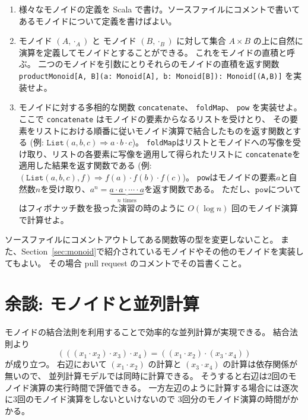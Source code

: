 \documentclass[a4paper,twoside,onecolumn,openany,article]{memoir}
\theoremstyle{remark}
\begin{document}
\begin{enumerate}
\item 様々なモノイドの定義を Scala で書け。ソースファイルにコメントで書いてあるモノイドについて定義を書けばよい。
\item モノイド $(A,\cdot_A)$ と モノイド $(B,\cdot_B)$ に対して集合 $A\times B$ の上に自然に演算を定義してモノイドとすることができる。
これをモノイドの直積と呼ぶ。
二つのモノイドを引数にとりそれらのモノイドの直積を返す関数
\texttt{productMonoid[A, B](a: Monoid[A], b: Monoid[B]): Monoid[(A,B)]}
を実装せよ。
\item モノイドに対する多相的な関数
\texttt{concatenate}、
\texttt{foldMap}、
\texttt{pow} を実装せよ。
ここで \texttt{concatenate} はモノイドの要素からなるリストを受けとり、
その要素をリストにおける順番に従いモノイド演算で結合したものを返す関数とする
(例: $\mathtt{List}(a, b, c) \Rightarrow a \cdot b \cdot c$)。
\texttt{foldMap}はリストとモノイドへの写像を受け取り、リストの各要素に写像を適用して得られたリストに
\texttt{concatenate}を適用した結果を返す関数である
(例: $(\mathtt{List}(a, b, c), f) \Rightarrow f(a) \cdot f(b) \cdot f(c)$)。
\texttt{pow}はモノイドの要素$a$と自然数$n$を受け取り、$a^n=\underbrace{a\cdot a\cdot \dotsm \cdot a}_{n \text{ times}}$を返す関数である。
ただし、$\texttt{pow}$についてはフィボナッチ数を扱った演習の時のように $O(\log n)$ 回のモノイド演算で計算せよ。
\end{enumerate}
ソースファイルにコメントアウトしてある関数等の型を変更しないこと。
また、Section~\ref{sec:monoid}で紹介されているモノイドやその他のモノイドを実装してもよい。
その場合 pull request のコメントでその旨書くこと。

\section{余談: モノイドと並列計算}
モノイドの結合法則を利用することで効率的な並列計算が実現できる。
結合法則より
\begin{equation*}
(((x_1 \cdot x_2) \cdot x_3) \cdot x_4)
=
((x_1 \cdot x_2) \cdot (x_3 \cdot x_4))
\end{equation*}
が成り立つ。
右辺において $(x_1\cdot x_2)$ の計算と $(x_3\cdot x_4)$ の計算は依存関係が無いので、
並列計算モデルでは同時に計算できる。
そうすると右辺は2回のモノイド演算の実行時間で評価できる。
一方左辺のように計算する場合には逐次に3回のモノイド演算をしないといけないので
3回分のモノイド演算の時間がかかる。
\end{document}
